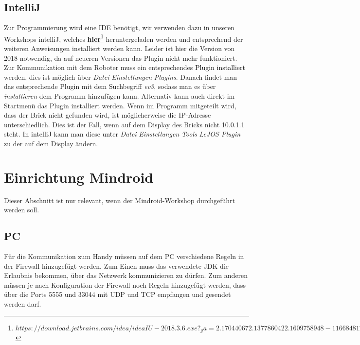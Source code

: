 \documentclass[
	ngerman,
	accentcolor=1c,%
	]{tudapub}
\begin{document}
\subsection{IntelliJ}
Zur Programmierung wird eine IDE ben\"otigt, wir verwenden dazu in unseren Workshops intelliJ, welches 
\href{https://download.jetbrains.com/idea/ideaIU-2018.3.6.exe?_ga=2.170440672.1377860422.1609758948-1166848123.1609758948}{\textbf{hier}\footnote{$https://download.jetbrains.com/idea/ideaIU-2018.3.6.exe?_ga=2.170440672.1377860422.1609758948-1166848123.1609758948$}}
heruntergeladen werden und entsprechend der weiteren Anweisungen installiert werden kann. Leider ist hier die Version von 2018 notwendig, da auf neueren Versionen das Plugin nicht mehr funktioniert. Zur Kommunikation mit dem Roboter muss ein entsprechendes Plugin installiert werden, dies ist möglich über \textit{Datei} \rightarrow{} \textit{Einstellungen} \rightarrow{} \textit{Plugins}. Danach findet man das entsprechende Plugin mit dem Suchbegriff \textit{ev3}, sodass man es \"uber \textit{installieren} dem Programm hinzuf\"ugen kann. Alternativ kann auch direkt im Startmenü das Plugin installiert werden.\newline
Wenn im Programm mitgeteilt wird, dass der Brick nicht gefunden wird, ist möglicherweise die IP-Adresse unterschiedlich. Dies ist der Fall, wenn auf dem Display des Bricks nicht 10.0.1.1 steht. In intelliJ kann man diese unter \textit{Datei} \rightarrow{} \textit{Einstellungen} \rightarrow{} \textit{Tools} \rightarrow{} \textit{LeJOS Plugin} zu der auf dem Display ändern.\\




\section{Einrichtung Mindroid}
\label{Einrichtung-Mindroid}
Dieser Abschnitt ist nur relevant, wenn der Mindroid-Workshop durchgef\"uhrt werden soll.

\subsection{PC}
F\"ur die Kommunikation zum Handy m\"ussen auf dem PC verschiedene Regeln in der Firewall hinzugef\"ugt werden. Zum Einen muss das verwendete JDK die Erlaubnis bekommen, über das Netzwerk kommunizieren zu dürfen. Zum anderen müssen je nach Konfiguration der Firewall noch Regeln hinzugefügt werden, dass über die Ports 5555 und 33044 mit UDP und TCP empfangen und gesendet werden darf.
\end{document}
